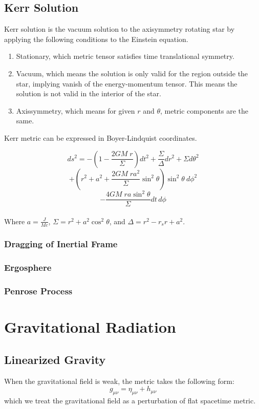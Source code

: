 \documentclass[12pt]{article}
\theoremstyle{mystyle}{\newtheorem{definition}{Definition}[subsection]}
\theoremstyle{mystyle}{\newtheorem{theorem}[definition]{Theorem}}
\theoremstyle{mystyle}{\newtheorem*{remark}{Remark}}
\theoremstyle{mystyle}{\newtheorem{example}{Example}[subsection]}
\theoremstyle{mystyle}{\newtheorem{examples}{Examples}[subsection]}
\theoremstyle{mystyle}{\newtheorem{cthm}{}[subsection]}
\begin{document}
\subsection{Kerr Solution}
Kerr solution is the vacuum solution to the axisymmetry rotating star by applying the following conditions to the Einstein equation.
\begin{enumerate}
  \item Stationary, which metric tensor satisfies time translational symmetry.
  \item Vacuum, which means the solution is only valid for the region outside the star, implying vanish of the energy-momentum tensor.
        This means the solution is not valid in the interior of the star.
  \item Axissymmetry, which means for given \(r\) and \(\theta\), metric components are the same.
\end{enumerate}
Kerr metric can be expressed in Boyer-Lindquist coordinates.
\begin{cthm}
  \[ds^{2} =
    -\left( 1 - \frac{2GM\; r}{\Sigma} \right) dt^{2} + \frac{\Sigma}{\Delta} dr^{2} + \Sigma d\theta^{2}
  \] \[+\left(r^2+ a^2 + \frac{2GM\; r a^{2}}{\Sigma} \sin^{2}\theta \right) \sin^{2}\theta \ d\phi^{2}\]
  \[ -\frac{4GM\; ra \sin^{2} \theta}{\Sigma} dt \, d\phi\]\\
  Where \(a = \frac{J}{Mc}\), \(\Sigma = r^{2} + a^{2} \cos^{2}\theta\), and \(\Delta = r^{2} - r_{s} r + a^{2}\).
\end{cthm}

\subsubsection{Dragging of Inertial Frame}

\subsubsection{Ergosphere}

\subsubsection{Penrose Process}
\newpage
\section{Gravitational Radiation}
\subsection{Linearized Gravity}
When the gravitational field is weak, the metric takes the following form:\[g_{\mu\nu} = \eta_{\mu\nu} + h_{\mu\nu} \]
which we treat the gravitational field as a perturbation of flat spacetime metric.
\end{document}
